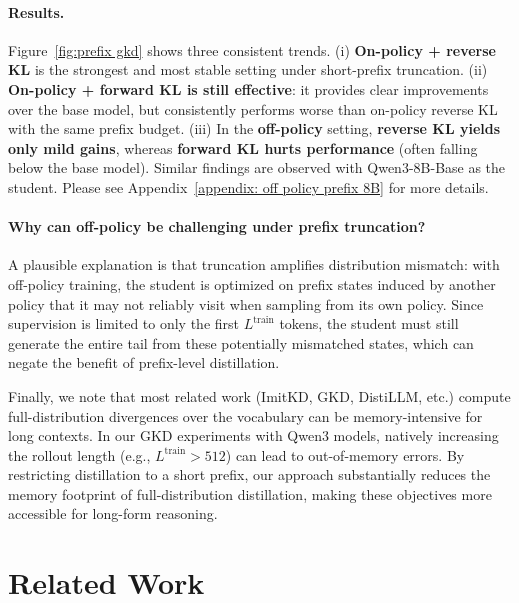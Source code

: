 \documentclass[11pt]{article}
\begin{document}
\paragraph{Results.}  
Figure~\ref{fig:prefix gkd} shows three consistent trends.  
(i) \textbf{On-policy + reverse KL} is the strongest and most stable setting under short-prefix truncation.  
(ii) \textbf{On-policy + forward KL is still effective}: it provides clear improvements over the base model, but  consistently performs worse than on-policy reverse KL with the same prefix budget.  
(iii) In the \textbf{off-policy} setting, \textbf{reverse KL yields only mild gains}, whereas \textbf{forward KL hurts performance} (often falling below the base model).  
Similar findings are observed with Qwen3-8B-Base as the student. Please see Appendix~\ref{appendix: off policy prefix 8B} for more details.  
  
\paragraph{Why can off-policy be challenging under prefix truncation?}  
A plausible explanation is that truncation amplifies distribution mismatch: with off-policy training, the student is optimized on prefix states induced by another policy that it may not reliably visit when sampling from its own policy. Since supervision is limited to only the first $L^{\text{train}}$ tokens, the student must still generate the entire tail from these potentially mismatched states, which can negate the benefit of prefix-level distillation. 

Finally, we note that most related work (ImitKD, GKD, DistiLLM, etc.) compute full-distribution divergences over the vocabulary can be memory-intensive for long contexts. In our GKD experiments with Qwen3 models, natively increasing the rollout length (e.g., $L^{\text{train}}{>}512$) can lead to out-of-memory errors. By restricting distillation to a short prefix, our approach substantially reduces the memory footprint of full-distribution distillation, making these objectives more accessible for long-form reasoning.  


\section{Related Work}  

  
\end{document}
